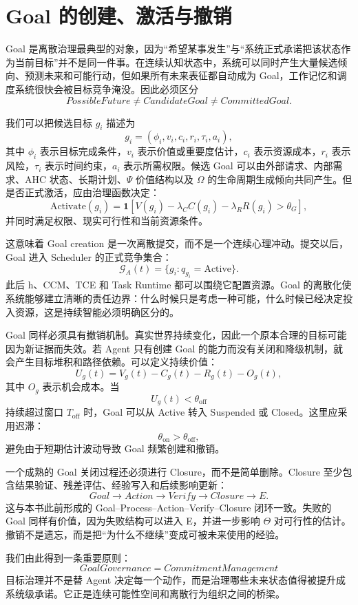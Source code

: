 \section{Goal 的创建、激活与撤销}

Goal 是离散治理最典型的对象，因为“希望某事发生”与“系统正式承诺把该状态作为当前目标”并不是同一件事。在连续认知状态中，系统可以同时产生大量候选倾向、预测未来和可能行动，但如果所有未来表征都自动成为 Goal，工作记忆和调度系统很快会被目标竞争淹没。因此必须区分
\[
PossibleFuture
\neq
CandidateGoal
\neq
CommittedGoal.
\]

我们可以把候选目标 \(g_i\) 描述为
\[
g_i
=
\left(
\phi_i,
v_i,
c_i,
r_i,
\tau_i,
a_i
\right),
\]
其中 \(\phi_i\) 表示目标完成条件，\(v_i\) 表示价值或重要度估计，\(c_i\) 表示资源成本，\(r_i\) 表示风险，\(\tau_i\) 表示时间约束，\(a_i\) 表示所需权限。候选 Goal 可以由外部请求、内部需求、AHC 状态、长期计划、\(\Psi\) 价值结构以及 \(\Omega\) 的生命周期生成倾向共同产生。但是否正式激活，应由治理函数决定：
\[
\mathrm{Activate}(g_i)
=
\mathbf 1
\left[
V(g_i)
-
\lambda_C C(g_i)
-
\lambda_R R(g_i)
>
\theta_G
\right],
\]
并同时满足权限、现实可行性和当前资源条件。

这意味着 Goal creation 是一次离散提交，而不是一个连续心理冲动。提交以后，Goal 进入 Scheduler 的正式竞争集合：
\[
\mathcal G_A(t)
=
\{
g_i:
q_{g_i}=\mathrm{Active}
\}.
\]
此后 h、CCM、TCE 和 Task Runtime 都可以围绕它配置资源。Goal 的离散化使系统能够建立清晰的责任边界：什么时候只是考虑一种可能，什么时候已经决定投入资源，这是持续智能必须明确区分的。

Goal 同样必须具有撤销机制。真实世界持续变化，因此一个原本合理的目标可能因为新证据而失效。若 Agent 只有创建 Goal 的能力而没有关闭和降级机制，就会产生目标堆积和路径依赖。可以定义持续价值：
\[
U_g(t)
=
V_g(t)
-
C_g(t)
-
R_g(t)
-
O_g(t),
\]
其中 \(O_g\) 表示机会成本。当
\[
U_g(t)<\theta_{\mathrm{off}}
\]
持续超过窗口 \(T_{\mathrm{off}}\) 时，Goal 可以从 Active 转入 Suspended 或 Closed。这里应采用迟滞：
\[
\theta_{\mathrm{on}}
>
\theta_{\mathrm{off}},
\]
避免由于短期估计波动导致 Goal 频繁创建和撤销。

一个成熟的 Goal 关闭过程还必须进行 Closure，而不是简单删除。Closure 至少包含结果验证、残差评估、经验写入和后续影响更新：
\[
Goal
\rightarrow
Action
\rightarrow
Verify
\rightarrow
Closure
\rightarrow
E.
\]
这与本书此前形成的 Goal--Process--Action--Verify--Closure 闭环一致。失败的 Goal 同样有价值，因为失败结构可以进入 E，并进一步影响 \(\Theta\) 对可行性的估计。撤销不是遗忘，而是把“为什么不继续”变成可被未来使用的经验。

我们由此得到一条重要原则：
\[
\boxed{
GoalGovernance
=
CommitmentManagement
}
\]
目标治理并不是替 Agent 决定每一个动作，而是治理哪些未来状态值得被提升成系统级承诺。它正是连续可能性空间和离散行为组织之间的桥梁。

